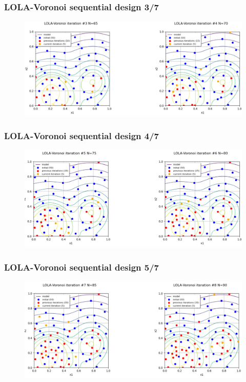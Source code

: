 \documentclass[aspectratio=169]{beamer}
\begin{document}
\begin{frame}
\frametitle{LOLA-Voronoi sequential design 3/7}

\begin{figure}
   \includegraphics[width=1.0\textwidth]{figures/lolavoronoi_2}
\end{figure}

\end{frame}


\begin{frame}
\frametitle{LOLA-Voronoi sequential design 4/7}

\begin{figure}
   \includegraphics[width=1.0\textwidth]{figures/lolavoronoi_3}
\end{figure}

\end{frame}


\begin{frame}
\frametitle{LOLA-Voronoi sequential design 5/7}

\begin{figure}
   \includegraphics[width=1.0\textwidth]{figures/lolavoronoi_4}
\end{figure}

\end{frame}
\end{document}
